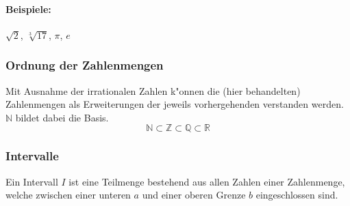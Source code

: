 \paragraph{Beispiele: } $\sqrt{2}$, $\sqrt[3]{17}$, $\pi$, $e$



\subsubsection{Ordnung der Zahlenmengen} 
Mit Ausnahme der irrationalen Zahlen k"onnen die (hier behandelten) Zahlenmengen als Erweiterungen der jeweils vorhergehenden verstanden werden. $\mathbb{N}$ bildet dabei die Basis.
\begin{equation*}
 \mathbb{N} \subset \mathbb{Z} \subset \mathbb{Q} \subset \mathbb{R}
\end{equation*}

\subsubsection{Intervalle}
Ein Intervall $I$ ist eine Teilmenge bestehend aus allen Zahlen einer Zahlenmenge, welche zwischen einer unteren $a$ und einer oberen Grenze $b$ eingeschlossen sind.
